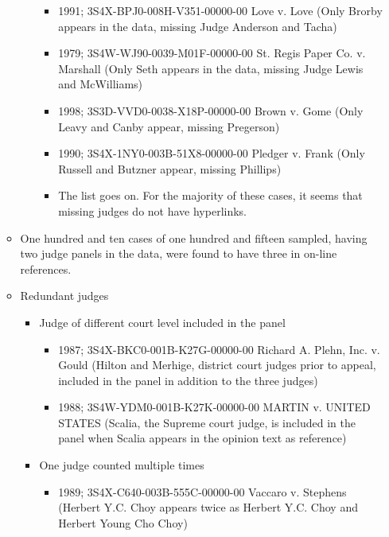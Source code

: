 \documentclass[10pt, letterpaper]{article}
\begin{document}
\begin{spacing}{1.0}
\begin{itemize}
\begin{itemize}
\begin{itemize}
\begin{itemize}
                \item 1991; 3S4X-BPJ0-008H-V351-00000-00 Love v. Love 
                (Only Brorby appears in the data, missing Judge Anderson and Tacha)
                
                \item 1979; 3S4W-WJ90-0039-M01F-00000-00 St. Regis Paper Co. v. Marshall 
                (Only Seth appears in the data, missing Judge Lewis and McWilliams)
                
                \item 1998; 3S3D-VVD0-0038-X18P-00000-00 Brown v. Gome 
                (Only Leavy and Canby appear, missing Pregerson)
                
                \item 1990; 3S4X-1NY0-003B-51X8-00000-00 Pledger v. Frank
                (Only Russell and Butzner appear, missing Phillips)
                
                \item The list goes on. For the majority of these cases, it seems that missing judges do not have hyperlinks.
            \end{itemize}
        \end{itemize}
    
        \item One hundred and ten cases of one hundred and fifteen sampled, having two judge panels in the data, were found to have three in on-line references. 
    
        \item Redundant judges
        \begin{itemize}            
            \item Judge of different court level included in the panel
            \begin{itemize} 
                \item 1987; 3S4X-BKC0-001B-K27G-00000-00 Richard A. Plehn, Inc. v. Gould 
                (Hilton and Merhige, district court judges prior to appeal, included in the panel in addition to the three judges)
                
                \item 1988; 3S4W-YDM0-001B-K27K-00000-00 MARTIN v. UNITED STATES
                (Scalia, the Supreme court judge, is included in the panel when Scalia appears in the opinion text as reference)
            \end{itemize}
            
            \item One judge counted multiple times
            \begin{itemize} 
                \item 1989; 3S4X-C640-003B-555C-00000-00 Vaccaro v. Stephens 
                (Herbert Y.C. Choy appears twice as Herbert Y.C. Choy and Herbert Young Cho Choy)
            \end{itemize}
            

\end{itemize}
\end{itemize}
\end{itemize}
\end{spacing}
\end{document}
